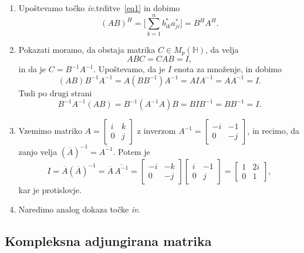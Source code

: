 \documentclass[mat1, tisk]{fmfdelo}
\numberwithin{equation}{section}
\begin{document}
\begin{dokaz}
\begin{enumerate}
        \item Upoštevamo točko \textit{iv}.\@ trditve~\ref{eq1} in dobimo
        \[(AB)^{H} = \bigg[
                    \sum_{k = 1}^{n} b_{ik}^{*}a_{ji}^{*}
                    \bigg]
                    =
                    B^{H}A^{H}.
                    \]
        \item Pokazati moramo, da obstaja matrika $C \in M_{p}(\mathbb{H})$, da velja
        $$ABC = CAB = I,$$
        in da je $C = B^{-1}A^{-1}$.
        Upoštevamo, da je $I$ enota za množenje, in dobimo
        $$(AB)B^{-1}A^{-1} = A(BB^{-1})A^{-1} 
        = AIA^{-1} 
        = AA^{-1} 
        = I.$$
        Tudi po drugi strani
        $$B^{-1}A^{-1}(AB) = B^{-1}(A^{-1}A)B 
        = BIB^{-1} 
        = BB^{-1} 
        = I.$$
        \item Vzemimo matriko
    $A = \begin{bmatrix}
        i & k \\
        0 & j
    \end{bmatrix}$
    z inverzom
    $A^{-1} = \begin{bmatrix}
        -i & -1 \\
        0 & -j
    \end{bmatrix}$,
    in recimo, da zanjo velja
    $(\overline{A})^{-1} = \overline{A^{-1}}$.
    Potem je 
    $$I = \overline{A}(\overline{A})^{-1} 
    = \overline{A} \, \overline{{A}^{-1}} 
    =
    \begin{bmatrix}
        -i & -k \\
        0 & -j
    \end{bmatrix}
    \begin{bmatrix}
        i & -1 \\
        0 & j
    \end{bmatrix} 
    =
    \begin{bmatrix}
        1 & 2i \\
        0 & 1
    \end{bmatrix},$$
    kar je protislovje.
    \item Naredimo analog dokaza točke \textit{iv}.  
    \end{enumerate} 

\end{dokaz}



\subsection{Kompleksna adjungirana matrika}
\end{document}
